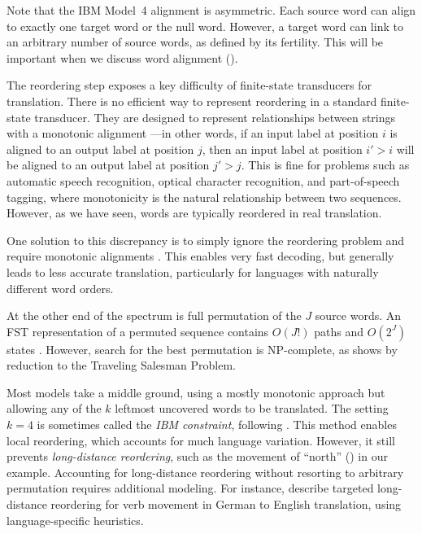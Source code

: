 Note that the IBM Model~4 alignment 
is asymmetric.  Each source word
can align to exactly one target word or the 
null word.  However, a target word can link to 
an arbitrary number of source words, as defined 
by its fertility.  This will be important when
we discuss word alignment ().


The reordering step exposes a key difficulty of 
finite-state transducers for translation.  
There is no efficient way to represent
reordering in a standard finite-state transducer.  They
are designed to represent relationships between
strings with a monotonic alignment 
---in other words, if an input label at position $i$
is aligned to an output label at position $j$, 
then an input label at position $i' > i$ will be aligned
to an output label at position $j' > j$.
This is fine for problems such as automatic
speech recognition, optical character recognition, and part-of-speech tagging,
where monotonicity is the natural relationship
between two sequences.  However, as we
have seen, words are typically reordered in 
real translation.

One solution to this discrepancy 
is to simply ignore the reordering
problem and require monotonic alignments
\citep{Tillman:1997:acl,Zens:2004:hlt-naacl,Banchs:2005:wpt}.  This enables
very fast decoding, but generally leads to
less accurate translation, particularly for
languages with naturally different word orders.

At the other end of the spectrum is 
full permutation of the $J$ source words.  
An FST representation of a permuted sequence contains $O(J!)$ paths and $O(2^J)$ states \citep{Och:2003:cl}.
However, search for the best permutation is NP-complete,
as \citet{Knight:1999:cl}
shows by reduction to the Traveling Salesman Problem.

Most models take a middle ground,
using a mostly monotonic approach but allowing
any of the $k$ leftmost uncovered words to be translated.  The 
setting $k=4$ is sometimes called the {\em IBM constraint}, 
following \citet{Berger:1996:patent}.
This method enables local reordering, which accounts
for much language variation.  However, it still prevents
{\em long-distance reordering}, such as the movement of ``north'' ()
in our example.  Accounting for long-distance reordering without
resorting to arbitrary permutation requires additional modeling.
For instance, \citet{Tillman:2003:cl} describe targeted
long-distance reordering for verb movement in German to English
translation, using language-specific heuristics.


